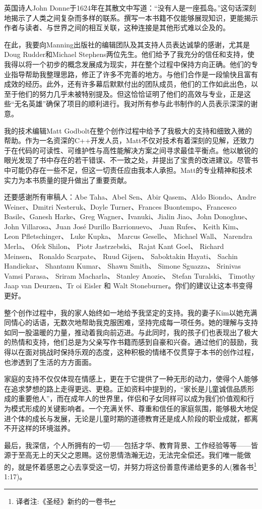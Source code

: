英国诗人John Donne于1624年在其散文中写道：“没有人是一座孤岛。”这句话深刻地揭示了人类之间复杂而多样的联系。撰写一本书籍不仅能够展现知识，更能揭示作者与读者、与世界之间的相互关联，这种连接是其他形式难以企及的。

在此，我要向Manning出版社的编辑团队及其支持人员表达诚挚的感谢，尤其是Doug Rudder和Michael Stephens两位先生。他们给予了我充分的信任和支持，使我得以将一个初步的概念发展成为现实，并在整个过程中保持方向正确。他们的专业指导帮助我整理思路，修正了许多不完善的地方。与他们合作是一段愉快且富有成效的经历。此外，还有许多幕后默默付出的团队成员，他们的工作如此出色，以至于他们的努力几乎未被特别提及。但这恰恰证明了他们的高效与专业，正是这些“无名英雄”确保了项目的顺利进行。我对所有参与此书制作的人员表示深深的谢意。

我的技术编辑Matt Godbolt在整个创作过程中给予了我极大的支持和细致入微的帮助。作为一名资深的C++开发人员，Matt不仅对技术有着深刻的见解，还致力于在代码的可读性、可维护性与高性能解决方案之间寻求最佳平衡点。他以敏锐的眼光发现了书中存在的若干错误、不一致之处，并提出了宝贵的改进建议。尽管书中可能仍存在一些不足，但这一切责任应由我本人承担。Matt的专业精神和技术实力为本书质量的提升做出了重要贡献。

还要感谢所有审稿人：Abe Taha、Abel Sen、Abir Qasem、Aldo Biondo、Andre Weiner、Dmitri Nesteruk、Doyle Turner、Frances Buontempo、Francesco Basile、Ganesh Harke、Greg Wagner、Ivanuki、Jialin Jiao、John Donoghue、 John Villarosa、Juan José Durillo Barrionuevo、 Juan Rufes、 Keith Kim、 Leon Pfletschinger、 Luke Kupka、 Marcus Geselle、 Michael Wall、 Narendra
Merla、 Ofek Shilon、 Piotr Jastrzebski、 Rajat Kant Goel、 Richard
Meinsen、 Ronaldo Scarpate、 Ruud Gijsen、 Saboktakin Hayati、
Sachin Handiekar、 Shantanu Kumar、 Shawn Smith、 Simone
Sguazza、 Srinivas Vamsi Parasa、 Sriram Macharla、 Stanley Anozie、
Stefan Turalski、 Timothy Jaap van Deurzen、Tr oi Eisler 和 Walt Stoneburner。你们的建议让这本书变得更好。

整个创作过程中，我的家人始终如一地给予我坚定的支持。我的妻子Kim以她充满同情心的话语，无数次地帮助我克服困难，坚持完成每一项任务。她的理解与支持如同一股温暖的力量，推动着我向前迈进。与此同时，我的孩子们也表现出了极大的热情和支持，他们总是为父亲写作书籍而感到自豪和兴奋。通过他们的鼓励，我得以在面对挑战时保持乐观的态度，这种积极的情绪不仅贯穿于本书的创作过程，也渗透到了生活的方方面面。

家庭的支持不仅仅体现在情感上，更在于它提供了一种无形的动力，使得个人能够在追求梦想的路上走得更远、更稳。正如资料中提到的，“家长是儿童诚信品质形成的重要他人”，而在成年人的世界里，伴侣和子女同样可以成为我们价值观和行为模式形成的关键影响者。一个充满关怀、尊重和信任的家庭氛围，能够极大地促进个体的成长与发展，无论是儿童时期的道德教育还是成人阶段的职业成就，都离不开这样的环境滋养。

最后，我深信，个人所拥有的一切——包括才华、教育背景、工作经验等等——皆源于至高无上的天父之恩赐。这份恩情浩瀚无边，无法完全偿还。我们唯一能做的，就是怀着感恩之心去享受这一切，并努力将这份善意传递给更多的人(雅各书\footnote{译者注:《圣经》新约的一卷书} 1:17)。

